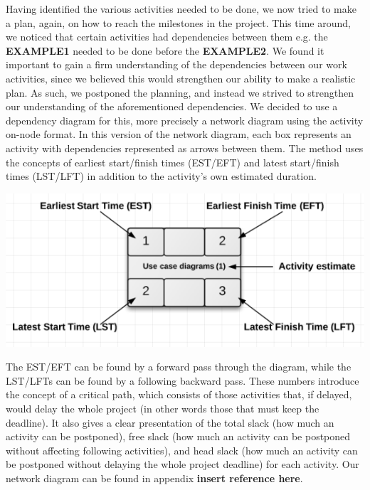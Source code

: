 Having identified the various activities needed to be done, we now tried to make a plan, again, on how to reach the milestones in the project. This time around, we noticed that certain activities had dependencies between them e.g. the \textbf{EXAMPLE1} needed to be done before the \textbf{EXAMPLE2}.
We found it important to gain a firm understanding of the dependencies between our work activities, since we believed this would strengthen our ability to make a realistic plan. As such, we postponed the planning, and instead we strived to strengthen our understanding of the aforementioned dependencies. We decided to use a dependency diagram for this, more precisely a network diagram using the activity on-node format.
In this version of the network diagram, each box represents an activity with dependencies represented as arrows between them. The method uses the concepts of earliest start/finish times (EST/EFT) and latest start/finish times (LST/LFT) in addition to the activity’s own estimated duration.

\includegraphics[scale=0.5]{./Empiri/Planning/img/networkdiagramnotation.png}
 
The EST/EFT can be found by a forward pass through the diagram, while the LST/LFTs can be found by a following backward pass.
These numbers introduce the concept of a critical path, which consists of those activities that, if delayed, would delay the whole project (in other words those that must keep the deadline). It also gives a clear presentation of the total slack (how much an activity can be postponed), free slack (how much an activity can be postponed without affecting following activities), and head slack (how much an activity can be postponed without delaying the whole project deadline) for each activity.
Our network diagram can be found in appendix \textbf{insert reference here}.